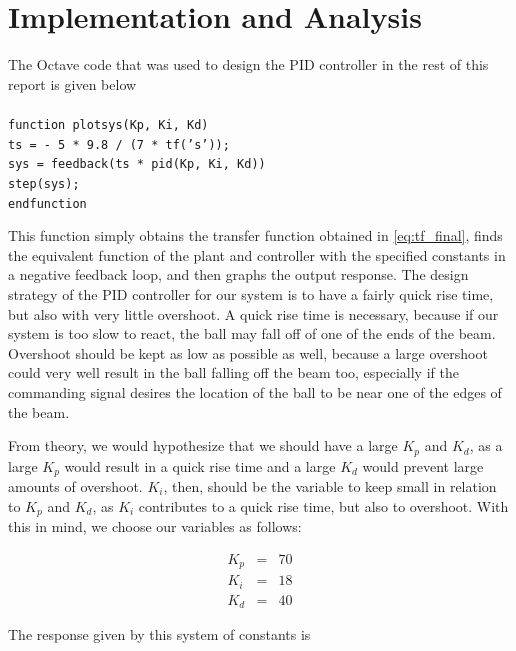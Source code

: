 \documentclass[a4paper, 12pt]{article}
\begin{document}

\section{Implementation and Analysis}
	The Octave code that was used to design the PID controller in the rest of
	this report is given below\\\\\noindent
	\texttt{function plotsys(Kp, Ki, Kd)\\\noindent
  ts = - 5 * 9.8 / (7 * tf('s'));\\\noindent
  sys = feedback(ts * pid(Kp, Ki, Kd))\\\noindent
  step(sys);\\\noindent
endfunction}

This function simply obtains the transfer function obtained in
\eqref{eq:tf_final}, finds the equivalent function of the plant and controller
with the specified constants in a negative feedback loop, and then graphs the
output response. The design strategy of the PID controller for our system is to
have a fairly quick rise time, but also with very little overshoot. A quick
rise time is necessary, because if our system is too slow to react, the ball
may fall off of one of the ends of the beam. Overshoot should be kept as low as
possible as well, because a large overshoot could very well result in the ball
falling off the beam too, especially if the commanding signal desires the
location of the ball to be near one of the edges of the beam.

From theory, we would hypothesize that we should have a large $K_p$ and $K_d$,
as a large $K_p$ would result in a quick rise time and a large $K_d$ would
prevent large amounts of overshoot. $K_i$, then, should be the variable to keep
small in relation to $K_p$ and $K_d$, as $K_i$ contributes to a quick rise
time, but also to overshoot. With this in mind, we choose our variables as
follows:

\begin{equation}
  \begin{array}{rcl}
	K_p & = & 70 \\
	K_i & = & 18 \\
	K_d & = & 40
  \end{array}
  \label{eq:pid_constants}
\end{equation}

The response given by this system of constants is
\end{document}

